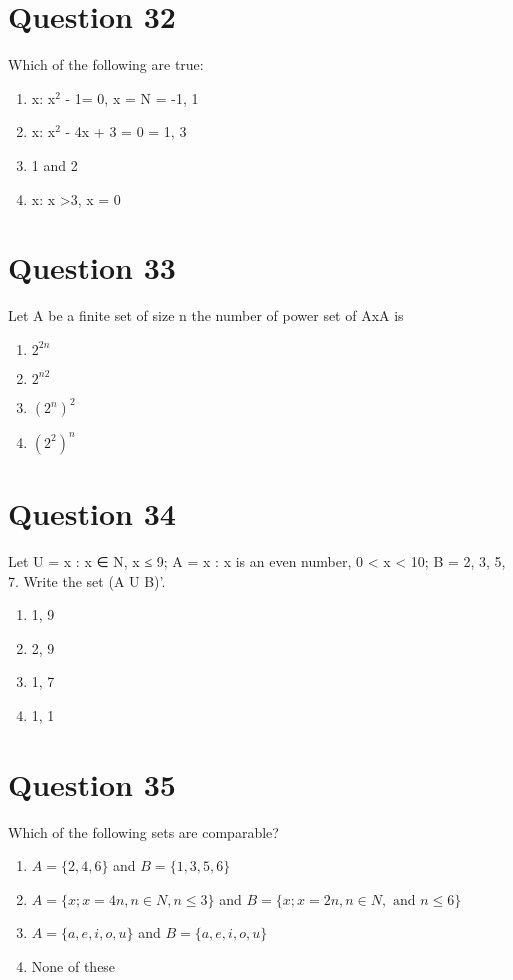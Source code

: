 \documentclass{article}
\begin{document}
\section*{Question 32}
Which of the following are true:\newline
\begin{enumerate}[label=(\alph*)]
\item {x: x$^{2}$ - 1= 0, x = N} = {-1, 1}\newline
\item {x: x$^{2}$ - 4x + 3 = 0} = {1, 3}
\item 1 and 2
\item {x: x >3, x = 0}\newline
\end{enumerate}
\newpage
\section*{Question 33}
Let A be a finite set of size n the number of power set of AxA is 
\begin{enumerate}[label=(\alph*)]
\item \(2^{2 n}\)
\item \(2^{n 2}\)
\item \(\left(2^{n}\right)^{2}\)
\item \(\left(2^{2}\right)^{n}\)
\end{enumerate}
\newpage
\section*{Question 34}
Let U = {x : x ∈ N, x ≤ 9}; A = {x : x is an even number, 0 < x < 10}; B = {2, 3, 5, 7}. Write the set (A U B)’.
\begin{enumerate}[label=(\alph*)]
\item {1, 9}
\item {2, 9}
\item {1, 7}\newline
\item {1, 1}\newline
\end{enumerate}
\newpage
\section*{Question 35}
Which of the following sets are comparable?\newline
\begin{enumerate}[label=(\alph*)]
\item \(A=\{2,4,6\}\) and \(B=\{1,3,5,6\}\)
\item \(A=\{x ; x=4 n, n \in N, n \leq 3\}\) and \(B=\{x ; x=2 n, n \in N, \text { and } n \leq 6\}\)
\item \(A=\{a, e, i, o, u\}\) and \(B=\{a, e, i, o, u\}\)
\item None of these
\end{enumerate}
\newpage
\end{document}
